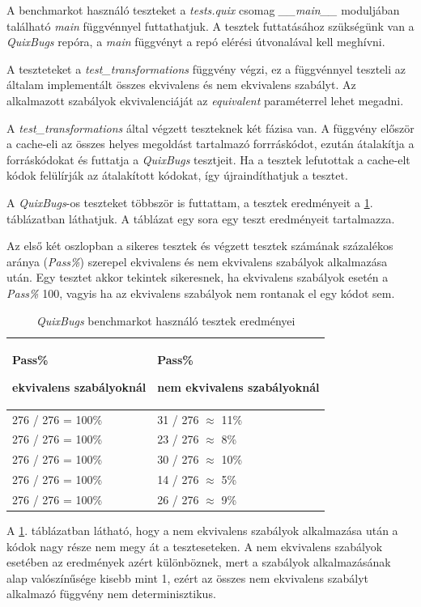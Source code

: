 A benchmarkot használó teszteket a \emph{tests.quix} csomag \emph{\_\_main\_\_} moduljában található
\emph{main} függvénnyel futtathatjuk.
A tesztek futtatásához szükségünk van a \emph{QuixBugs} repóra, a \emph{main} függvényt
a repó elérési útvonalával kell meghívni.

A teszteteket a \emph{test\_transformations} függvény végzi,
ez a függvénnyel teszteli az általam implementált összes ekvivalens és nem ekvivalens szabályt.
Az alkalmazott szabályok ekvivalenciáját az \emph{equivalent} paraméterrel lehet megadni.

A \emph{test\_transformations} által végzett teszteknek két fázisa van.
A függvény először a cache-eli az összes helyes megoldást tartalmazó forrráskódot,
ezután átalakítja a forráskódokat és futtatja a \emph{QuixBugs} tesztjeit.
Ha a tesztek lefutottak a cache-elt kódok felülírják az átalakított kódokat,
így újraindíthatjuk a tesztet.

A \emph{QuixBugs}-os teszteket többször is futtattam,
a tesztek eredményeit a \ref{tab:quix_tests}. táblázatban láthatjuk.
A táblázat egy sora egy teszt eredményeit tartalmazza.

Az első két oszlopban a sikeres tesztek és végzett tesztek számának százalékos aránya (\emph{Pass\%})
szerepel ekvivalens és nem ekvivalens szabályok alkalmazása után.
Egy tesztet akkor tekintek sikeresnek, ha ekvivalens szabályok esetén a \emph{Pass\%} 100,
vagyis ha az ekvivalens szabályok nem rontanak el egy kódot sem.

\begin{table}[H]
	\centering
	\begin{tabular}{ | m{} | m{} | }
		\hline
		\textbf{Pass\%}
		
		\textbf{ekvivalens szabályoknál}
		&
		\textbf{Pass\%}
		
		\textbf{nem ekvivalens szabályoknál}
		\\
		\hline \hline
		276 / 276 = 100\% & 31 / 276 $\approx$ 11\% \\
		\hline
		276 / 276 = 100\% & 23 / 276 $\approx$ 8\% \\
		\hline
		276 / 276 = 100\% & 30 / 276 $\approx$ 10\% \\
		\hline
		276 / 276 = 100\% & 14 / 276 $\approx$ 5\% \\
		\hline
		276 / 276 = 100\% & 26 / 276 $\approx$ 9\% \\
		\hline
	\end{tabular}
	\caption{\emph{QuixBugs} benchmarkot használó tesztek eredményei}
	\label{tab:quix_tests}
\end{table}

A \ref{tab:quix_tests}. táblázatban látható, hogy a nem ekvivalens szabályok alkalmazása után
a kódok nagy része nem megy át a teszteseteken.
A nem ekvivalens szabályok esetében az eredmények azért különböznek,
mert a szabályok alkalmazásának alap valószínűsége kisebb mint 1,
ezért az összes nem ekvivalens szabályt alkalmazó függvény nem determinisztikus.

\pagebreak
